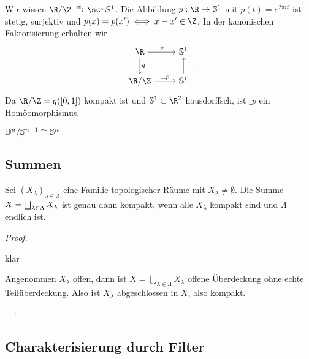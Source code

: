 \begin{ex}
	Wir wissen $\R / \Z \homto \scr S^1$.
	Die Abbildung $p: \R \to \S^1$ mit $p(t) = e^{2\pi i t}$ ist stetig, surjektiv und $p(x) = p(x') \iff x-x' \in \Z$.
	In der kanonischen Faktorisierung erhalten wir
	\[
		\begin{tikzcd}
			\R \arrow{d}{q} \arrow{r}{p} & \S^1 \\
			\R / \Z \arrow{r}{\_p} & \S^1 \arrow{u}
		\end{tikzcd}.
	\]
	Da $\R / \Z = q([0,1])$ kompakt ist und $\S^1 \subset \R^2$ hausdorffsch, ist $\_p$ ein Homöomorphismus.
\end{ex}

\begin{ex}
	$\mathbb{D}^n / \mathbb{S}^{n-1} \cong \mathbb{S}^n$
\end{ex}

\subsection{Summen}

\begin{st}
	Sei $(X_\lambda)_{\lambda\in\Lambda}$ eine Familie topologischer Räume mit $X_\lambda \neq \emptyset$.
	Die Summe $X = \bigsqcup_{\lambda \in \Lambda} X_\lambda$ ist genau dann kompakt, wenn alle $X_\lambda$ kompakt sind und $\Lambda$ endlich ist.
	\begin{proof}
		\begin{segnb}[„$\impliedby$“]
			klar
		\end{segnb}
		\begin{segnb}[„$\implies$“]
			Angenommen $X_\lambda$ offen, dann ist $X = \bigcup_{\lambda\in\Lambda} X_\lambda$ offene Überdeckung ohne echte Teilüberdeckung.
			Also ist $X_\lambda$ abgeschlossen in $X$, also kompakt.
		\end{segnb}
	\end{proof}
\end{st}

\subsection{Charakterisierung durch Filter}

